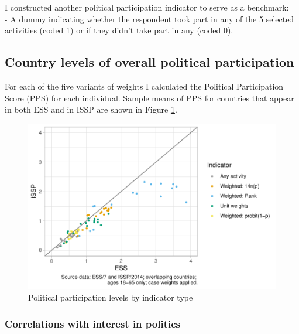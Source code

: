 \documentclass[12pt,]{article}
\begin{document}
I constructed another political participation indicator to serve as a benchmark:\\
- A dummy indicating whether the respondent took part in any of the 5 selected activities (coded 1) or if they didn't take part in any (coded 0).

\hypertarget{country-levels-of-overall-political-participation}{%
\subsection{Country levels of overall political participation}\label{country-levels-of-overall-political-participation}}

For each of the five variants of weights I calculated the Political Participation Score (PPS) for each individual. Sample means of PPS for countries that appear in both ESS and in ISSP are shown in Figure \ref{fig:part-level-dot-plot}.

\begin{figure}[H]

{\centering \includegraphics{report_files/figure-latex/part-level-dot-plot-1} 

}

\caption{Political participation levels by indicator type}\label{fig:part-level-dot-plot}
\end{figure}

\hypertarget{correlations-with-interest-in-politics}{%
\subsubsection{Correlations with interest in politics}\label{correlations-with-interest-in-politics}}
\end{document}
